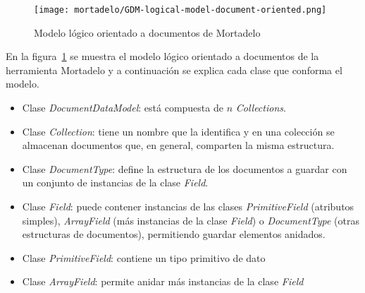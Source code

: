 \begin{figure}[h!t] 
    \centering
    \texttt{[image: mortadelo/GDM-logical-model-document-oriented.png]}
    \caption{Modelo lógico orientado a documentos de Mortadelo}
    \label{img:mortadelo-gdm-logical-model-document-oriented}
\end{figure}


En la figura~\ref{img:mortadelo-gdm-logical-model-document-oriented} se muestra el modelo lógico orientado a documentos de la herramienta Mortadelo y a continuación se explica cada clase que conforma el modelo.


\begin{itemize}
    \item Clase \textit{DocumentDataModel}: está compuesta de $n$ \textit{Collections}.
    \item Clase \textit{Collection}: tiene un nombre que la identifica y en una colección se almacenan documentos que, en general, comparten la misma estructura.
    \item Clase \textit{DocumentType}: define la estructura de los documentos a guardar con un conjunto de instancias de la clase \textit{Field}.
    \item Clase \textit{Field}: puede contener instancias de las clases \textit{PrimitiveField} (atributos simples), \textit{ArrayField} (más instancias de la clase \textit{Field}) o \textit{DocumentType} (otras estructuras de documentos), permitiendo guardar elementos anidados.
    \item Clase \textit{PrimitiveField}: contiene un tipo primitivo de dato
    \item Clase \textit{ArrayField}: permite anidar más instancias de la clase \textit{Field}
\end{itemize}
